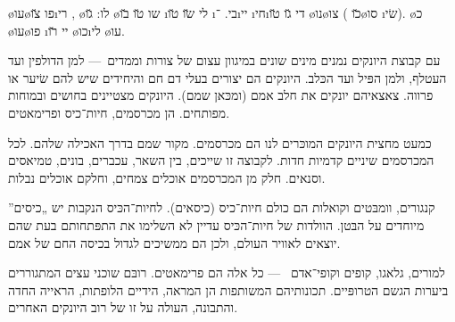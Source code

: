
\o{עו}\o{פו}  \u{צו}\i{רי}   , \o{לו}: \u{גו} \o{שו}  \u{טו} \u{בו} \i{לי} \u{שו}  \u{טו} \i{בי}.  ־\i{יי} \i{חי}\i{די} \u{גו} \u{טו} \o{נו}\o{צו} (  \u{כו}\o{סו} \i{שׂי}). \o{כ} \o{עו}\o{פו}  \i{יי} \u{רו} \o{כו}\i{לי} \o{עו}.



עם קבוצת היונקים נמנים מינים שונים במיגוון עצום של צורות וממדים~— למן הדולפין ועד העטלף, ולמן הפּיל ועד הכּלב. היונקים הם יצורים בעלי דם חם והיחידים שיש להם שׂיער או פרווה. צאצאיהם יונקים את חלב אמם (ומכּאן שמם). היונקים מצטיינים בחושים ובמוחות מפותחים.  הן מכרסמים, חיות־כיס ופרימאטים.



כמעט מחצית היונקים המוכּרים לנו הם מכרסמים. מקור שמם בדרך האכילה שלהם. לכל המכרסמים שיניים קדמיות חדות. לקבוצה זו שייכים, בין השאר, עכברים, בונים, טמיאסים וסנאים. חלק מן המכרסמים אוכלים צמחים, וחלקם אוכלים נבלות.



קנגורים, וומבּטים וקואלות הם כולם חיות־כיס (כיסאים). לחיות־הכּיס הנקבות יש „כיסים” מיוחדים על הבּטן. הוולדות של חיות־הכּיס עדיין לא השלימו את התפּתחותם בעת שהם יוצאים לאוויר העולם, ולכן הם ממשיכים לגדול בכיסה החם של אמם.



למורים, גלאגו, קופים וקופי־אדם ~— כל אלה הם פרימאטים. רובּם שוכני עצים המתגוררים ביערות הגשם הטרופּיים. תכונותיהם המשותפות הן המראה, הידיים הלופתות, הראייה החדה והתבונה, העולה על זו של רוב היונקים האחרים.

